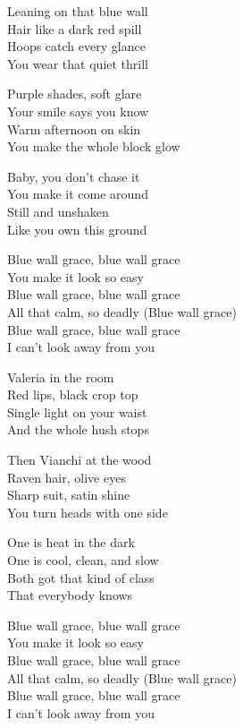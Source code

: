 \begin{lyrics}
Leaning on that blue wall\\
Hair like a dark red spill\\
Hoops catch every glance\\
You wear that quiet thrill

Purple shades, soft glare\\
Your smile says you know\\
Warm afternoon on skin\\
You make the whole block glow

Baby, you don’t chase it\\
You make it come around\\
Still and unshaken\\
Like you own this ground

Blue wall grace, blue wall grace\\
You make it look so easy\\
Blue wall grace, blue wall grace\\
All that calm, so deadly
(Blue wall grace)\\
Blue wall grace, blue wall grace\\
I can’t look away from you

Valeria in the room\\
Red lips, black crop top\\
Single light on your waist\\
And the whole hush stops

Then Vianchi at the wood\\
Raven hair, olive eyes\\
Sharp suit, satin shine\\
You turn heads with one side

One is heat in the dark\\
One is cool, clean, and slow\\
Both got that kind of class\\
That everybody knows

Blue wall grace, blue wall grace\\
You make it look so easy\\
Blue wall grace, blue wall grace\\
All that calm, so deadly
(Blue wall grace)\\
Blue wall grace, blue wall grace\\
I can’t look away from you


\end{lyrics}
